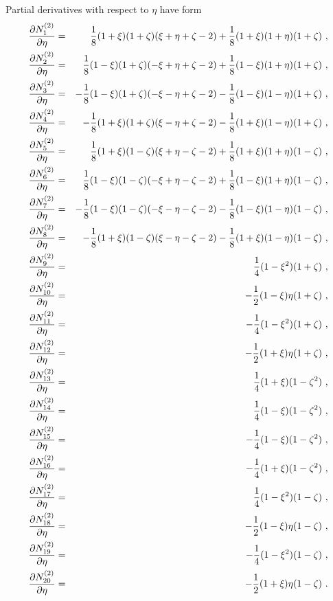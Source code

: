 Partial derivatives with respect to $\eta$ have form
\begin{eqnarray}
\label{bfquadhexdy1}
\ppd{N_{1}^{(2)}}{\eta} &=& \del{1}{8} (1 + \xi) (1 + \zeta)
(\xi + \eta + \zeta - 2) + \del{1}{8} (1 + \xi) (1 + \eta) (1 + \zeta)\ ,
\\ \label{bfquadhexdy2}
\ppd{N_{2}^{(2)}}{\eta} &=& \del{1}{8} (1 - \xi) (1 + \zeta)
(- \xi + \eta + \zeta - 2) + \del{1}{8} (1 - \xi) (1 + \eta) (1 + \zeta)\ ,
\\ \label{bfquadhexdy3}
\ppd{N_{3}^{(2)}}{\eta} &=& - \del{1}{8} (1 - \xi) (1 + \zeta)
(- \xi - \eta + \zeta - 2) - \del{1}{8} (1 - \xi) (1 - \eta) (1 + \zeta)\ ,
\\ \label{bfquadhexdy4}
\ppd{N_{4}^{(2)}}{\eta} &=& - \del{1}{8} (1 + \xi) (1 + \zeta)
(\xi - \eta + \zeta - 2) - \del{1}{8} (1 + \xi) (1 - \eta) (1 + \zeta)\ ,
\\ \label{bfquadhexdy5}
\ppd{N_{5}^{(2)}}{\eta} &=& \del{1}{8} (1 + \xi) (1 - \zeta)
(\xi + \eta - \zeta - 2) + \del{1}{8} (1 + \xi) (1 + \eta) (1 - \zeta)\ ,
\\ \label{bfquadhexdy6}
\ppd{N_{6}^{(2)}}{\eta} &=& \del{1}{8} (1 - \xi) (1 - \zeta)
(- \xi + \eta - \zeta - 2) + \del{1}{8} (1 - \xi) (1 + \eta) (1 - \zeta)\ ,
\\ \label{bfquadhexdy7}
\ppd{N_{7}^{(2)}}{\eta} &=& - \del{1}{8} (1 - \xi) (1 - \zeta)
(- \xi - \eta - \zeta - 2) - \del{1}{8} (1 - \xi) (1 - \eta) (1 - \zeta)\ ,
\\ \label{bfquadhexdy8}
\ppd{N_{8}^{(2)}}{\eta} &=& - \del{1}{8} (1 + \xi) (1 - \zeta)
(\xi - \eta - \zeta - 2) - \del{1}{8} (1 + \xi) (1 - \eta) (1 - \zeta)\ ,
\\ \label{bfquadhexdy9}
\ppd{N_{9}^{(2)}}{\eta} &=& \del{1}{4} (1 - \xi^2) (1 + \zeta)\ ,
\\ \label{bfquadhexdy10}
\ppd{N_{10}^{(2)}}{\eta} &=& - \del{1}{2} (1 - \xi) \eta (1 + \zeta)\ ,
\\ \label{bfquadhexdy11}
\ppd{N_{11}^{(2)}}{\eta} &=& - \del{1}{4} (1 - \xi^2) (1 + \zeta)\ ,
\\ \label{bfquadhexdy12}
\ppd{N_{12}^{(2)}}{\eta} &=& - \del{1}{2} (1 + \xi) \eta (1 + \zeta)\ ,
\\ \label{bfquadhexdy13}
\ppd{N_{13}^{(2)}}{\eta} &=& \del{1}{4} (1 + \xi) (1 - \zeta^2)\ ,
\\ \label{bfquadhexdy14}
\ppd{N_{14}^{(2)}}{\eta} &=& \del{1}{4} (1 - \xi) (1 - \zeta^2)\ ,
\\ \label{bfquadhexdy15}
\ppd{N_{15}^{(2)}}{\eta} &=& - \del{1}{4} (1 - \xi) (1 - \zeta^2)\ ,
\\ \label{bfquadhexdy16}
\ppd{N_{16}^{(2)}}{\eta} &=& - \del{1}{4} (1 + \xi) (1 - \zeta^2)\ ,
\\ \label{bfquadhexdy17}
\ppd{N_{17}^{(2)}}{\eta} &=& \del{1}{4} (1 - \xi^2) (1 - \zeta)\ ,
\\ \label{bfquadhexdy18}
\ppd{N_{18}^{(2)}}{\eta} &=& - \del{1}{2} (1 - \xi) \eta (1 - \zeta)\ ,
\\ \label{bfquadhexdy19}
\ppd{N_{19}^{(2)}}{\eta} &=& - \del{1}{4} (1 - \xi^2) (1 - \zeta)\ ,
\\ \label{bfquadhexdy20}
\ppd{N_{20}^{(2)}}{\eta} &=& - \del{1}{2} (1 + \xi) \eta (1 - \zeta)\ .
\end{eqnarray}
